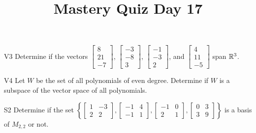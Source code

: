 \documentclass{sbgLAquiz}
\title{Mastery Quiz Day 17 }
\begin{document}
\begin{problem}{V3}
Determine if the vectors  $\begin{bmatrix} 8 \\ 21 \\ -7 \end{bmatrix}$, $\begin{bmatrix} -3 \\ -8 \\ 3 \end{bmatrix}$, $\begin{bmatrix} -1 \\ -3 \\ 2 \end{bmatrix}$, and $\begin{bmatrix} 4 \\ 11 \\ -5 \end{bmatrix}$ span $\mathbb{R}^3$.
\end{problem}

\begin{problem}{V4} Let $W$ be the set of all polynomials of even degree.  Determine if $W$ is a subspace of the vector space of all polynomials.
\end{problem}
\newpage

\begin{problem}{S2}
Determine if the set $\left\{
\begin{bmatrix} 1 & -3 \\ 2 & 2 \end{bmatrix},
\begin{bmatrix} -1 & 4 \\ -1 & 1 \end{bmatrix},
\begin{bmatrix} -1 & 0 \\ 2 & 1 \end{bmatrix},
\begin{bmatrix} 0 & 3 \\ 3 & 9 \end{bmatrix}
\right\}$ is a basis of $M_{2,2}$ or not.
\end{problem}
\end{document}

